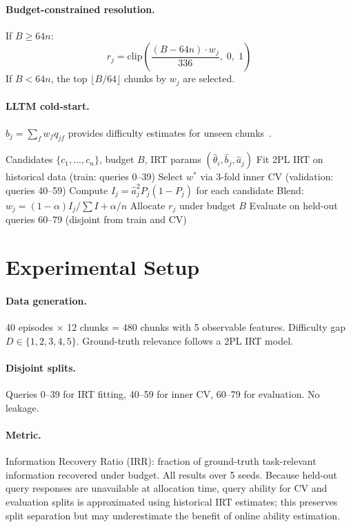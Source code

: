 \documentclass{article}
\begin{document}
\paragraph{Budget-constrained resolution.} If $B \geq 64n$:
\begin{equation}
r_j = \mathrm{clip}\!\left(\frac{(B - 64n) \cdot w_j}{336},\; 0,\; 1\right)
\end{equation}
If $B < 64n$, the top $\lfloor B/64 \rfloor$ chunks by $w_j$ are selected.

\paragraph{LLTM cold-start.} $\hat{b}_j = \sum_f w_f q_{jf}$ provides difficulty estimates for unseen chunks~\citep{fischer1973lltm}.

\begin{algorithm}[ht!]
\caption{AD-IRT-Mem}
\label{alg:main}
\begin{algorithmic}[1]
\REQUIRE Candidates $\{c_1, \ldots, c_n\}$, budget $B$, IRT params $(\hat\theta_i, \hat{b}_j, \hat{a}_j)$
\STATE Fit 2PL IRT on historical data (train: queries 0--39)
\STATE Select $w^*$ via 3-fold inner CV (validation: queries 40--59)
\STATE Compute $I_j = \hat{a}_j^2 P_j(1-P_j)$ for each candidate
\STATE Blend: $w_j = (1-\alpha) I_j/\sum I + \alpha/n$
\STATE Allocate $r_j$ under budget $B$
\STATE Evaluate on held-out queries 60--79 (disjoint from train and CV)
\end{algorithmic}
\end{algorithm}

\section{Experimental Setup}

\paragraph{Data generation.} 40 episodes $\times$ 12 chunks = 480 chunks with 5 observable features. Difficulty gap $D \in \{1,2,3,4,5\}$. Ground-truth relevance follows a 2PL IRT model.

\paragraph{Disjoint splits.} Queries 0--39 for IRT fitting, 40--59 for inner CV, 60--79 for evaluation. No leakage.

\paragraph{Metric.} Information Recovery Ratio (IRR): fraction of ground-truth task-relevant information recovered under budget. All results over 5 seeds. Because held-out query responses are unavailable at allocation time, query ability for CV and evaluation splits is approximated using historical IRT estimates; this preserves split separation but may underestimate the benefit of online ability estimation.
\end{document}
